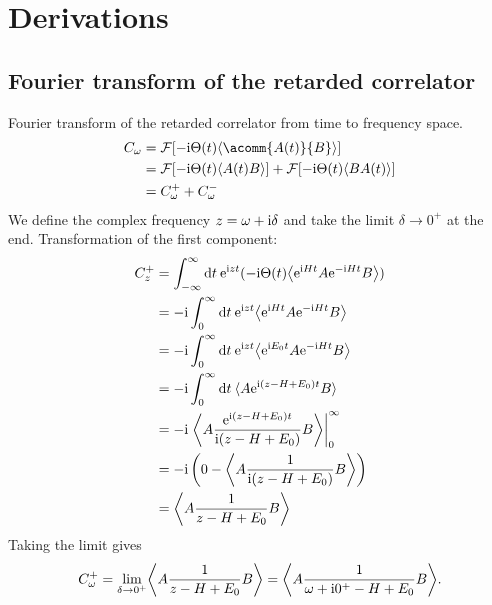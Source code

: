 
\chapter{Derivations}

\section{Fourier transform of the retarded correlator}
\label{app:fourier-transform}

Fourier transform of the retarded correlator from time to frequency space.
\begin{align}
    C_\omega
     & =
    \mathcal{F}[-\mi \Theta(t) \expval{\acomm{A(t)}{B}}] \\
     & =
    \mathcal{F}[-\mi \Theta(t) \expval{A(t) B}]
    +
    \mathcal{F}[-\mi \Theta(t) \expval{B A(t)}]          \\
     & =
    C^+_\omega + C^-_\omega
\end{align}
We define the complex frequency $z=\omega+\mathrm{i}\delta$ and take the limit $\delta\to 0^+$ at the end.
Transformation of the first component:
\begin{align}
    C^+_z
     & =
    \int_{-\infty}^\infty \md t \>
    \me^{\mi zt}(-\mi \Theta(t) \expval*{\me^{\mi Ht} A \me^{-\mi Ht} B}) \\
     & =
    -\mi \int_0^\infty \md t \>
    \me^{\mi zt} \expval*{\me^{\mi Ht} A \me^{-\mi Ht} B}                 \\
     & =
    -\mi \int_0^\infty \md t \>
    \me^{\mi zt} \expval*{\me^{\mi E_0t} A \me^{-\mi Ht} B}               \\
     & =
    -\mi \int_0^\infty \md t \>
    \expval{A \me^{\mi(z - H + E_0)t} B}                                  \\
     & =
    -\mi \left.\expval*{A \frac{\me^{\mi(z - H + E_0)t}}{\mi(z - H + E_0)} B}
    \right|_0^\infty                                                      \\
     & =
    -\mi \left(0 - \expval*{A \frac{1}{\mi(z - H + E_0)} B}\right)        \\
     & =
    \expval*{A \frac{1}{z - H + E_0} B}
\end{align}
Taking the limit gives
\begin{equation}
    C^+_\omega
    =
    \lim_{\delta\to 0^+} \expval*{A \frac{1}{z - H + E_0} B}
    =
    \expval*{A \frac{1}{\omega + \mi0^+ - H + E_0} B}.
\end{equation}
